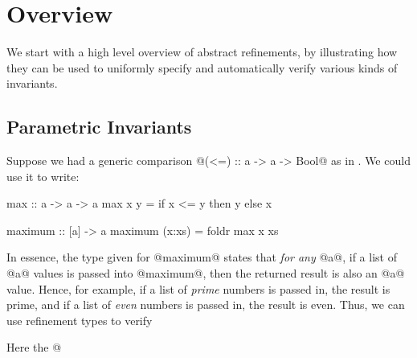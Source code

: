 \section{Overview}\label{sec:abstractrefinements:overview}

We start with a high level overview of abstract refinements, 
by illustrating how they can be used to uniformly specify and 
automatically verify various kinds of invariants.

\subsection{Parametric Invariants}\label{sec:overview:parametric}

Suppose we had a generic comparison @(<=) :: a -> a -> Bool@ as in
\ocaml.
We could use it to write: 
\begin{code}
  max     :: a -> a -> a
  max x y = if x <= y then y else x 

  maximum :: [a] -> a
  maximum (x:xs) = foldr max x xs
\end{code}
In essence, the type given for @maximum@ states that
\emph{for any} @a@, if a list of @a@ values is passed
into @maximum@, then the returned result is also an @a@
value.
%
Hence, for example, if a list of \emph{prime} numbers 
is passed in, the result is prime, and if a list of 
\emph{even} numbers is passed in, the result is even. 
Thus, we can use refinement types \cite{LiquidPLDI08} 
to verify
%
%
Here the @%
